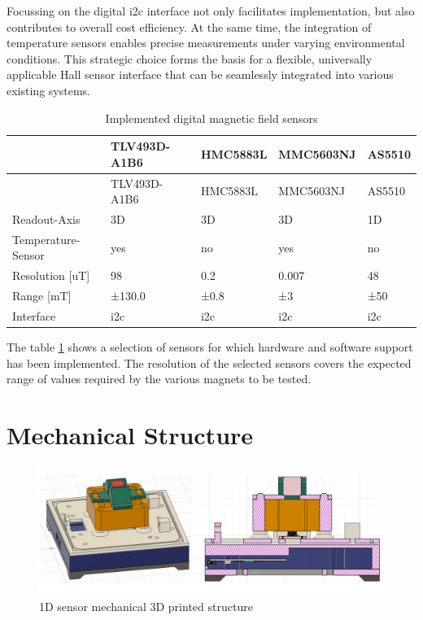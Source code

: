 Focussing on the digital \gls{i2c} interface not only facilitates
implementation, but also contributes to overall cost efficiency. At the
same time, the integration of temperature sensors enables precise
measurements under varying environmental conditions. This strategic
choice forms the basis for a flexible, universally applicable Hall
sensor interface that can be seamlessly integrated into various existing
systems.

\begin{longtable}[]{@{}lllll@{}}
\caption{Implemented digital magnetic field sensors
\label{Implemented_digital_magnetic_field_sensors.csv}}\tabularnewline
\toprule
& TLV493D-A1B6 & HMC5883L & MMC5603NJ & AS5510\tabularnewline
\midrule
\endfirsthead
\toprule
& TLV493D-A1B6 & HMC5883L & MMC5603NJ & AS5510\tabularnewline
\midrule
\endhead
Readout-Axis & 3D & 3D & 3D & 1D\tabularnewline
Temperature-Sensor & yes & no & yes & no\tabularnewline
Resolution {[}uT{]} & 98 & 0.2 & 0.007 & 48\tabularnewline
Range {[}mT{]} & ±130.0 & ±0.8 & ±3 & ±50\tabularnewline
Interface & \gls{i2c} & \gls{i2c} & \gls{i2c} & \gls{i2c}\tabularnewline
\bottomrule
\end{longtable}

The table \ref{Implemented_digital_magnetic_field_sensors.csv} shows a
selection of sensors for which hardware and software support has been
implemented. The resolution of the selected sensors covers the expected
range of values required by the various magnets to be tested.

\hypertarget{mechanical-structure}{%
\section{Mechanical Structure}\label{mechanical-structure}}

\begin{figure}
\centering
\includegraphics{./generated_images/border_1D_sensor_mechanical_3D_printed_structure.png}
\caption{1D sensor mechanical 3D printed structure
\label{1D_sensor_mechanical_3D_printed_structure.png}}
\end{figure}

